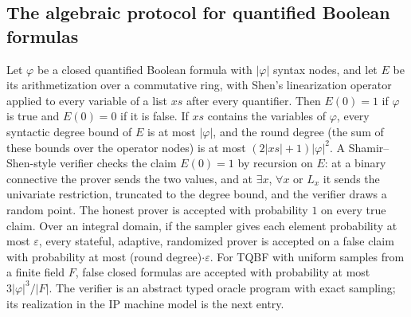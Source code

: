 \begin{result}
\subsection{The algebraic protocol for quantified Boolean formulas}
Let $\varphi$ be a closed quantified Boolean formula with $|\varphi|$ syntax nodes, and let
$E$ be its arithmetization over a commutative ring, with Shen's linearization operator
applied to every variable of a list $xs$ after every quantifier. Then $E(0)=1$ if $\varphi$
is true and $E(0)=0$ if it is false. If $xs$ contains the variables of $\varphi$, every
syntactic degree bound of $E$ is at most $|\varphi|$, and the round degree (the sum of these
bounds over the operator nodes) is at most $(2|xs|+1)|\varphi|^2$. A Shamir--Shen-style
verifier checks the claim $E(0)=1$ by recursion on $E$: at a binary connective the prover
sends the two values, and at $\exists x$, $\forall x$ or $L_x$ it sends the univariate
restriction, truncated to the degree bound, and the verifier draws a random point. The
honest prover is accepted with probability $1$ on every true claim. Over an integral
domain, if the sampler gives each element probability at most $\varepsilon$, every
stateful, adaptive, randomized prover is accepted on a false claim with probability at
most (round degree)$\cdot\varepsilon$. For TQBF with uniform samples from a finite field
$F$, false closed formulas are accepted with probability at most $3|\varphi|^3/|F|$. The
verifier is an abstract typed oracle program with exact sampling; its realization in the IP
machine model is the next entry.
\citep{LundFortnowKarloffNisan1992,Shamir1992,Shen1992}\citep[Chapter 8]{AroraBarak09}
\end{result}

